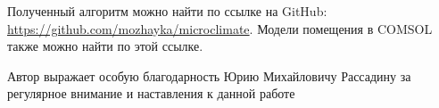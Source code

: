 Полученный алгоритм можно найти по ссылке на GitHub: \url{https://github.com/mozhayka/microclimate}. Модели помещения в COMSOL также можно найти по этой ссылке.

\newpage


Автор выражает особую благодарность Юрию Михайловичу Рассадину за регулярное внимание и наставления к данной работе